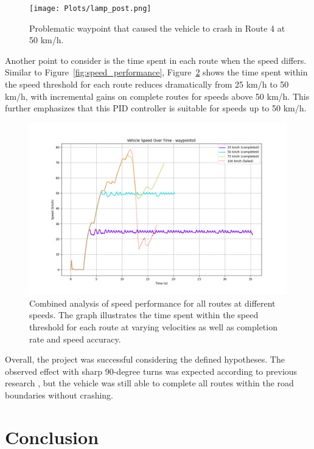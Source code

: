 \documentclass[conference]{IEEEtran}
\begin{document}
\begin{figure}[h]
    \centering
    \texttt{[image: Plots/lamp\_post.png]}
    \caption{Problematic waypoint that caused the vehicle to crash in Route 4 at 50 km/h.}
    \label{fig:lamp_post}
\end{figure}

Another point to consider is the time spent in each route when the speed differs. Similar to Figure~\ref{fig:speed_performance}, Figure~\ref{fig:combined} shows the time spent within the speed threshold for each route reduces dramatically from 25 km/h to 50 km/h, with incremental gains on complete routes for speeds above 50 km/h. This further emphasizes that this PID controller is suitable for speeds up to 50 km/h.

\begin{figure}[h]
    \centering
    \includegraphics[width=\columnwidth]{Plots/combined_speed_performance_waypoints0.png}
    \caption{Combined analysis of speed performance for all routes at different speeds. The graph illustrates the time spent within the speed threshold for each route at varying velocities as well as completion rate and speed accuracy.}
    \label{fig:combined}
\end{figure}

Overall, the project was successful considering the defined hypotheses. The observed effect with sharp 90-degree turns was expected according to previous research \cite{10.25165/j.ijabe.20241701.7296}, but the vehicle was still able to complete all routes within the road boundaries without crashing.

\section{Conclusion}
\end{document}
